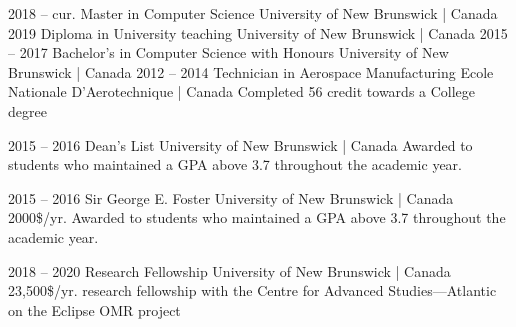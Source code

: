 \documentclass[9.5pt]{developercv} %
\begin{document}
\justifying


\begin{entrylist}
    \entry
        {2018 -- cur.}
        {Master in Computer Science}
        {University of New Brunswick | Canada}
        {}
    \entry
        {2019}
        {Diploma in University teaching}
        {University of New Brunswick | Canada}
        {}
    \entry
        {2015 -- 2017}
        {Bachelor's in Computer Science with Honours}
        {University of New Brunswick | Canada}
        {}
    \entry
        {2012 -- 2014}
        {Technician in Aerospace Manufacturing}
        {Ecole Nationale D'Aerotechnique | Canada}
        {Completed 56 credit towards a College degree}
\end{entrylist}


\begin{entrylist}
    \entry
        {2015 -- 2016}
        {Dean's List}
        {University of New Brunswick | Canada}
        {Awarded to students who maintained a GPA above 3.7 throughout the academic year.}
\end{entrylist}


\begin{entrylist}
    \entry
        {2015 -- 2016}
        {Sir George E. Foster}
        {University of New Brunswick | Canada}
        {2000\$/yr. Awarded to students who maintained a GPA above 3.7 throughout the academic year.}
        
    \entry
        {2018 -- 2020}
        {Research Fellowship}
        {University of New Brunswick | Canada}
        {23,500\$/yr. research fellowship  with the Centre for Advanced Studies---Atlantic on the Eclipse OMR project}
\end{entrylist}

\end{document}
